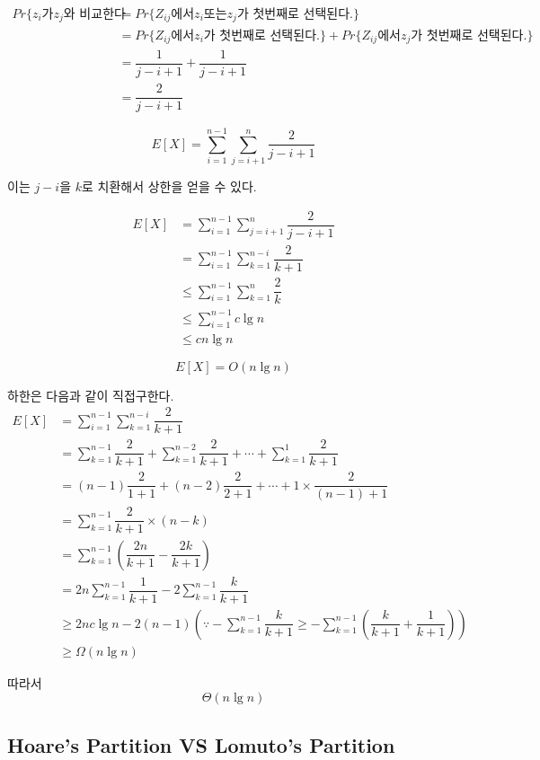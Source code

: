 \begin{align*}
    Pr\{ z_i \mbox{가} z_j\mbox{와 비교한다} 
    &= Pr\{ Z_{ij}\mbox{에서} z_i \mbox{또는} z_j\mbox{가 첫번째로 선택된다.}\}\\
    &= Pr\{ Z_{ij} \mbox{에서} z_i \mbox{가 첫번째로 선택된다}.\} + Pr\{ Z_{ij}\mbox{에서} z_j \mbox{가 첫번째로 선택된다.}\} \\
    &= \dfrac{1}{j-i+1} + \dfrac{1}{j-i+1} \\
    &= \dfrac{2}{j-i+1}    
\end{align*}
    

$$E[X] =  \sum_{i=1}^{n-1}\sum_{j=i+1}^{n} \dfrac{2}{j-i+1}$$

이는 $j-i$을 $k$로 치환해서 상한을 얻을 수 있다.

\begin{align*}
    E[X] & = \sum_{i=1}^{n-1}\sum_{j=i+1}^{n} \dfrac{2}{j-i+1}\\
    & =  \sum_{i=1}^{n-1}\sum_{k = 1}^{n-i} \dfrac{2}{k+1} \\
    & \le \sum_{i=1}^{n-1}\sum_{k = 1}^{n} \dfrac{2}{k} \\
    & \le \sum_{i=1}^{n-1} c\lg n \\
    & \le c n \lg n    
\end{align*}


$$E[X]= O(n \lg n)$$

하한은 다음과 같이 직접구한다.
\begin{align*}    
E[X] &= \sum_{i=1}^{n-1}\sum_{k = 1}^{n-i} \dfrac{2}{k+1} \\
& = \sum_{k = 1}^{n-1} \dfrac{2}{k+1} + \sum_{k = 1}^{n-2} \dfrac{2}{k+1} + \cdots + \sum_{k = 1}^{1} \dfrac{2}{k+1}\\
& = (n-1)\dfrac{2}{1+1} + (n-2)\dfrac{2}{2+1} + \cdots +1 \times \dfrac{2}{(n-1)+1}\\
& = \sum_{k=1}^{n-1} \dfrac{2}{k+1} \times (n-k)\\
& = \sum_{k=1}^{n-1} \left( \dfrac{2n}{k+1} -\dfrac{2k}{k+1}\right)\\
& = 2n \sum_{k=1}^{n-1} \dfrac{1}{k+1} - 2\sum_{k=1}^{n-1} \dfrac{k}{k+1}\\
& \ge 2nc\lg n - 2(n-1) \left(\because -\sum_{k=1}^{n-1} \dfrac{k}{k+1} \ge -\sum_{k=1}^{n-1}\left( \dfrac{k}{k+1}+\dfrac{1}{k+1}  \right)\right)\\
& \ge \Omega(n\lg n) 
\end{align*}

따라서 $$\Theta(n\lg n)$$
\subsection{Hoare's Partition VS Lomuto's Partition}

